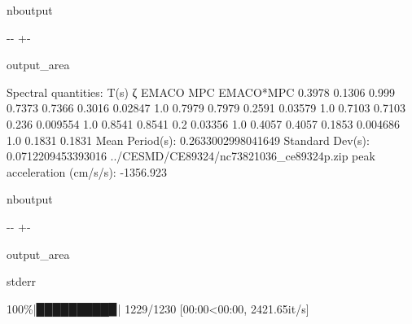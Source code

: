 \documentclass[letterpaper,10pt,english]{sphinxmanual}
\begin{document}
\begin{sphinxuseclass}{nboutput}
{

\kern-\sphinxverbatimsmallskipamount\kern-\baselineskip
\kern+\FrameHeightAdjust\kern-\fboxrule
\vspace{\nbsphinxcodecellspacing}

\begin{sphinxuseclass}{output_area}
\begin{sphinxuseclass}{}


\begin{sphinxVerbatim}[commandchars=\\\{\}]
Spectral quantities:
       T(s)        ζ        EMACO        MPC     EMACO*MPC
      0.3978     0.1306     0.999      0.7373     0.7366
      0.3016     0.02847    1.0        0.7979     0.7979
      0.2591     0.03579    1.0        0.7103     0.7103
      0.236      0.009554   1.0        0.8541     0.8541
      0.2        0.03356    1.0        0.4057     0.4057
      0.1853     0.004686   1.0        0.1831     0.1831
Mean Period(s): 0.2633002998041649
Standard Dev(s): 0.0712209453393016
../CESMD/CE89324/nc73821036\_ce89324p.zip
peak acceleration (cm/s/s): -1356.923
\end{sphinxVerbatim}



\end{sphinxuseclass}
\end{sphinxuseclass}
}

\end{sphinxuseclass}
\begin{sphinxuseclass}{nboutput}
{

\kern-\sphinxverbatimsmallskipamount\kern-\baselineskip
\kern+\FrameHeightAdjust\kern-\fboxrule
\vspace{\nbsphinxcodecellspacing}

\begin{sphinxuseclass}{output_area}
\begin{sphinxuseclass}{stderr}


\begin{sphinxVerbatim}[commandchars=\\\{\}]
100\%|█████████▉| 1229/1230 [00:00<00:00, 2421.65it/s]
\end{sphinxVerbatim}



\end{sphinxuseclass}
\end{sphinxuseclass}
}

\end{sphinxuseclass}
\end{document}
